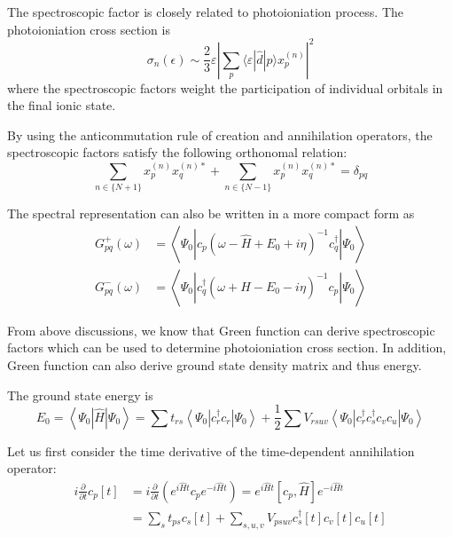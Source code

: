 The spectroscopic factor is closely related to photoioniation process.
The photoioniation cross section is
\begin{equation}
\sigma_{n}(\epsilon) \sim \frac{2}{3} \varepsilon\left|\sum_{p}\langle\varepsilon|\hat{d}| p\rangle x_{p}^{(n)}\right|^{2}
\end{equation}
where the spectroscopic factors weight the participation of individual orbitals in the final ionic state.

By using the anticommutation rule of creation and annihilation operators, the spectroscopic factors satisfy the following orthonomal relation:
\begin{equation}
\sum_{n \in\{N+1\}} x_{p}^{(n)} x_{q}^{(n) *}+\sum_{n \in\{N-1\}} x_{p}^{(n)} x_{q}^{(n) *}=\delta_{p q}
\end{equation}

The spectral representation can also be written in a more compact form as
\begin{equation}
\begin{aligned} G_{p q}^{+}(\omega) &=\left\langle\Psi_{0}\left|c_{p}\left(\omega-\hat{H}+E_{0}+i \eta\right)^{-1} c_{q}^{\dagger}\right| \Psi_{0}\right\rangle \\ G_{p q}^{-}(\omega) &=\left\langle\Psi_{0}\left|c_{q}^{\dagger}\left(\omega+\hat{H}-E_{0}-i \eta\right)^{-1} c_{p}\right| \Psi_{0}\right\rangle \end{aligned}
\end{equation}

From above discussions, we know that Green function can derive spectroscopic factors which can be used to determine photoioniation cross section.
In addition, Green function can also derive ground state density matrix and thus energy.

The ground state energy is
\begin{equation}
E_{0}=\left\langle\Psi_{0}|\hat{H}| \Psi_{0}\right\rangle=\sum t_{r s}\left\langle\Psi_{0}\left|c_{r}^{\dagger} c_{r}\right| \Psi_{0}\right\rangle+\frac{1}{2} \sum V_{r s u v}\left\langle\Psi_{0}\left|c_{r}^{\dagger} c_{s}^{\dagger} c_{v} c_{u}\right| \Psi_{0}\right\rangle
\end{equation}

Let us first consider the time derivative of the time-dependent annihilation operator:
\begin{equation}
\begin{aligned}
	i \frac{\partial}{\partial t} c_{p}[t]&=i \frac{\partial}{\partial t}\left(e^{i \hat{H} t} c_{p} e^{-i \hat{H} t}\right)=e^{i \hat{H} t}\left[c_{p}, \hat{H}\right] e^{-i \hat{H} t}
	\\
	&=\sum_{s} t_{p s} c_{s}[t]+\sum_{s, u, v} V_{p s u v} c_{s}^{\dagger}[t] c_{v}[t] c_{u}[t]
\end{aligned}
\end{equation}


